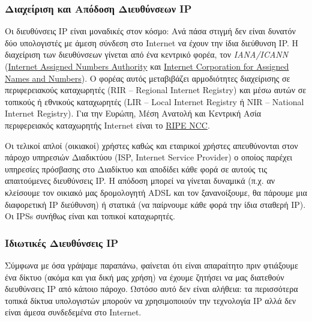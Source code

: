 \subsubsection*{Διαχείριση και Απόδοση Διευθύνσεων IP}

Οι διευθύνσεις IP είναι μοναδικές στον κόσμο: Ανά πάσα στιγμή δεν είναι δυνατόν δύο υπολογιστές με άμεση σύνδεση στο Internet να έχουν την ίδια διεύθυνση IP. Η διαχείριση των διευθύνσεων γίνεται από ένα κεντρικό φορέα, τον \emph{IANA/ICANN} (\href{http://www.iana.org}{Internet Assigned Numbers Authority} και \href{https://www.icann.org}{Internet Corporation for Assigned Names and Numbers}). Ο φορέας αυτός μεταβιβάζει αρμοδιότητες διαχείρισης σε περιφερειακούς καταχωρητές (RIR -- Regional Internet Registry) και μέσω αυτών σε τοπικούς ή εθνικούς καταχωρητές (LIR -- Local Internet Registry ή NIR -- National Internet Registry). Για την Ευρώπη, Μέση Ανατολή και Κεντρική Ασία περιφερειακός καταχωρητής Internet είναι το \href{https://www.ripe.net/}{RIPE NCC}.

Οι τελικοί απλοί (οικιακοί) χρήστες καθώς και εταιρικοί χρήστες απευθύνονται στον πάροχο υπηρεσιών Διαδικτύου (ISP, Internet Service Provider) ο οποίος παρέχει υπηρεσίες πρόσβασης στο Διαδίκτυο και αποδίδει κάθε φορά σε αυτούς τις απαιτούμενες διευθύνσεις IP. Η απόδοση μπορεί να γίνεται δυναμικά (π.χ. αν κλείσουμε τον οικιακό μας δρομολογητή ADSL και τον ξανανοίξουμε, θα πάρουμε μια διαφορετική IP διεύθυνση) ή στατικά (να παίρνουμε κάθε φορά την ίδια σταθερή IP). Οι IPSs συνήθως είναι και τοπικοί καταχωρητές.

\subsubsection*{Ιδιωτικές Διευθύνσεις IP}

Σύμφωνα με όσα γράψαμε παραπάνω, φαίνεται ότι είναι απαραίτητο πριν φτιάξουμε ένα δίκτυο (ακόμα και για δική μας χρήση) να έχουμε ζητήσει να μας διατεθούν διευθύνσεις IP από κάποιο πάροχο. Ωστόσο αυτό δεν είναι αλήθεια: τα περισσότερα τοπικά δίκτυα υπολογιστών μπορούν να χρησιμοποιούν την τεχνολογία IP αλλά δεν είναι άμεσα συνδεδεμένα στο Internet.

